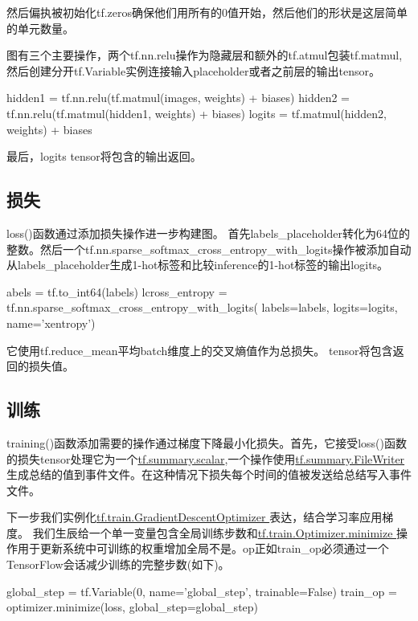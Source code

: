 然后偏执被初始化tf.zeros确保他们用所有的0值开始，然后他们的形状是这层简单的单元数量。

图有三个主要操作，两个tf.nn.relu操作为隐藏层和额外的tf.atmul包装tf.matmul,然后创建分开tf.Variable实例连接输入placeholder或者之前层的输出tensor。
\begin{pythoncode}
hidden1 = tf.nn.relu(tf.matmul(images, weights) + biases)
hidden2 = tf.nn.relu(tf.matmul(hidden1, weights) + biases)
logits = tf.matmul(hidden2, weights) + biases 
\end{pythoncode}
最后，logits tensor将包含的输出返回。
\subsection{损失}
loss()函数通过添加损失操作进一步构建图。
首先labels\_placeholder转化为64位的整数。然后一个tf.nn.sparse\_softmax\_cross\_entropy\_with\_logits操作被添加自动从labels\_placeholder生成1-hot标签和比较inference的1-hot标签的输出logits。
\begin{pythoncode}
abels = tf.to_int64(labels)
lcross_entropy = tf.nn.sparse_softmax_cross_entropy_with_logits(
    labels=labels, logits=logits, name='xentropy')
\end{pythoncode}
它使用tf.reduce\_mean平均batch维度上的交叉熵值作为总损失。\newline 
{}
tensor将包含返回的损失值。
\subsection{训练}
training()函数添加需要的操作通过梯度下降最小化损失。首先，它接受loss()函数的损失tensor处理它为一个\href{https://www.tensorflow.org/api_docs/python/tf/summary/scalar}{tf.summary.scalar},一个操作使用\href{https://www.tensorflow.org/api_docs/python/tf/summary/FileWriter}{tf.summary.FileWriter}生成总结的值到事件文件。在这种情况下损失每个时间的值被发送给总结写入事件文件。

下一步我们实例化\href{https://www.tensorflow.org/api_docs/python/tf/train/GradientDescentOptimizer}{tf.train.GradientDescentOptimizer }表达，结合学习率应用梯度。\newline
{}
我们生辰给一个单一变量包含全局训练步数和\href{https://www.tensorflow.org/api_docs/python/tf/train/Optimizer#minimize}{tf.train.Optimizer.minimize }操作用于更新系统中可训练的权重增加全局不是。op正如train\_op必须通过一个TensorFlow会话减少训练的完整步数(如下)。
\begin{pythoncode}
global_step = tf.Variable(0, name='global_step', trainable=False)
train_op = optimizer.minimize(loss, global_step=global_step)
\end{pythoncode}
